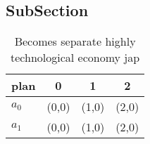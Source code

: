 \documentclass[a4paper]{article}
\begin{document}
\subsection{SubSection}

\begin{table}
\begin{adjustbox}{width=0.6\columnwidth}
\begin{tabular}{|l|l|l|l|}
\hline
\textbf{plan} & \multicolumn{1}{c|}{\textbf{0}} & \multicolumn{1}{c|}{\textbf{1}} & \multicolumn{1}{c|}{\textbf{2}} \\ \hline
\textbf{$a_0$}  & (0,0) & (1,0) & (2,0) \\ \hline
\textbf{$a_1$}  & (0,0) & (1,0) & (2,0) \\ \hline
\end{tabular}
\end{adjustbox}
\caption{Becomes separate highly technological economy jap
}
\end{table}
\end{document}
